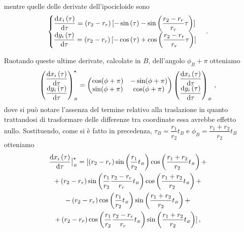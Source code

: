 \noindent mentre quelle delle derivate dell'ipocicloide sono
\begin{equation}
\begin{cases}
\dfrac{{\rm d}{x_i}\left(\tau\right)}{{\rm d}\tau} = 
\left(r_2-r_r\right)
[-\sin\left(\tau\right) -
\sin\left(\dfrac{r_2-r_r}{r_r}\tau\right)] \\
\dfrac{{\rm d}{y_i}\left(\tau\right)}{{\rm d}\tau} = 
\left(r_2-r_r\right)
[-\cos\left(\tau\right) +
\cos\left(\dfrac{r_2-r_r}{r_r}\tau\right)]
\end{cases}\,.
\label{eq:dipocicloide}
\end{equation}

\noindent Ruotando queste ultime derivate, calcolate in $B$, dell'angolo
$\phi_{\scriptscriptstyle B}+\pi$  otteniamo
\begin{equation}
\begin{pmatrix}
\dfrac{{\rm d}{x_i}\left(\tau\right)}{{\rm d}\tau}
\\
\dfrac{{\rm d}{y_i}\left(\tau\right)}{{\rm d}\tau}
\end{pmatrix}^\star_{\scriptscriptstyle B}
 =
\begin{pmatrix} \cos(\phi + \pi) &-\sin(\phi + \pi)\\
		 \sin(\phi + \pi) &\cos(\phi + \pi) \end{pmatrix}
\begin{pmatrix}
\dfrac{{\rm d}{x_i}\left(\tau\right)}{{\rm d}\tau}
\\
\dfrac{{\rm d}{y_i}\left(\tau\right)}{{\rm d}\tau}
\end{pmatrix}_{\scriptscriptstyle B}\,,
\label{eq:derivata_ruotata}
\end{equation}
\noindent dove si pu\`o notare l'assenza del termine relativo
 alla traslazione in quanto trattandosi di trasformare delle 
differenze tra coordinate essa avrebbe effetto nullo.
Sostituendo, come si \`e fatto in precedenza,
$\tau_{\scriptscriptstyle B} = {\dfrac{r_1}{r_2}}t_{\scriptscriptstyle B}$ e
$\phi_{\scriptscriptstyle B}={\dfrac{r_1+r_2}{r_2}}t_{\scriptscriptstyle B}$
otteniamo
\begin{multline}
\dfrac{{\rm d}{x_i}\left(\tau\right)}{{\rm d}\tau}\bigr|^\star_{\scriptscriptstyle B} = 
[\left(r_2-r_r\right)\sin\left(\dfrac{r_1}{r_2}t_{\scriptscriptstyle B}\right)
\cos\left(\dfrac{r_1+r_2}{r_2}t_{\scriptscriptstyle B}\right) + \\ +
\left(r_2-r_r\right)\sin\left(\dfrac{r_1}{r_2}\dfrac{r_2-r_r}{r_r}t_{\scriptscriptstyle B}\right)
\cos\left(\dfrac{r_1+r_2}{r_2}t_{\scriptscriptstyle B}\right) + \\ -
\left(r_2-r_r\right)\cos\left(\dfrac{r_1}{r_2}t_{\scriptscriptstyle B}\right)
\sin\left(\dfrac{r_1+r_2}{r_2}t_{\scriptscriptstyle B}\right) + \\ +
\left(r_2-r_r\right)\cos\left(\dfrac{r_1}{r_2}\dfrac{r_2-r_r}{r_r}t_{\scriptscriptstyle B}\right)
\sin\left(\dfrac{r_1+r_2}{r_2}t_{\scriptscriptstyle B}\right)]\,,
\label{eq:dx_in_t}
\end{multline}
